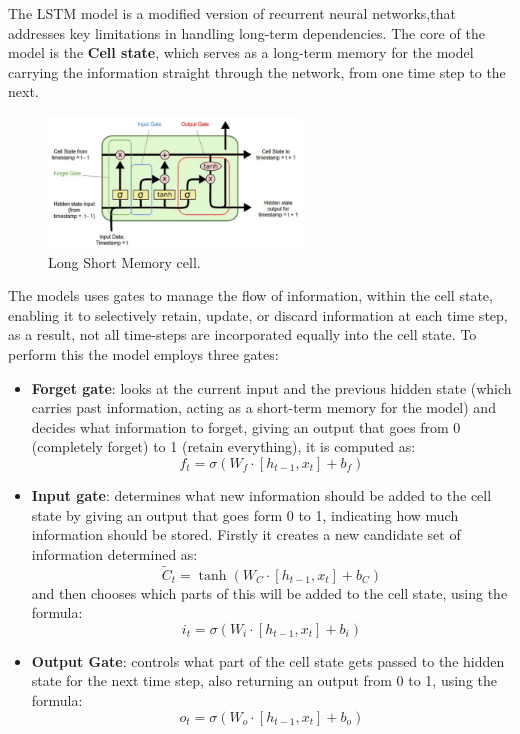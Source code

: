 The LSTM model is a modified version of recurrent neural networks,that addresses key limitations in handling long-term dependencies. The core of the model is the \textbf{Cell state}, which serves as a long-term memory for the model carrying the information straight through the network, from one time step to the next.
\begin{figure}[H] 
    \centering
    \includegraphics[width=0.6\textwidth]{Machine_learning_thesis/Images/LSTM cell.png}
    \caption{Long Short Memory cell.} 
    \label{fig:LSTM cell} 
\end{figure}
The models uses gates to manage the flow of information, within the cell state, enabling it to selectively retain, update, or discard information at each time step, as a result, not all time-steps are incorporated equally into the cell state. To perform this the model employs three gates:
\begin{itemize}
    \item \textbf{Forget gate}: looks at the current input and the previous hidden state (which carries past information, acting as a short-term memory for the model) and decides what information to forget, giving an output that goes from 0 (completely forget) to 1 (retain everything), it is computed as: 
    \[
    f_t = \sigma\left(W_f \cdot \left[h_{t-1}, x_t\right] + b_f\right)
    \]
    \item \textbf{Input gate}: determines what new information should be added to the cell state by giving an output that goes form 0 to 1, indicating how much information should be stored. Firstly it creates a new candidate set of information determined as: 
    \[
    \tilde{C}_t = \tanh\left(W_C \cdot \left[h_{t-1}, x_t\right] + b_C\right)
    \]
    and then chooses which parts of this will be added to the cell state, using the formula:
    \[
    i_t = \sigma\left(W_i \cdot \left[h_{t-1}, x_t\right] + b_i\right)
    \]
    \item \textbf{Output Gate}: controls what part of the cell state gets passed to the hidden state for the next time step, also returning an output from 0 to 1, using the formula:
    \[
    o_t = \sigma\left(W_o \cdot \left[h_{t-1}, x_t\right] + b_o\right)
    \]
\end{itemize}

